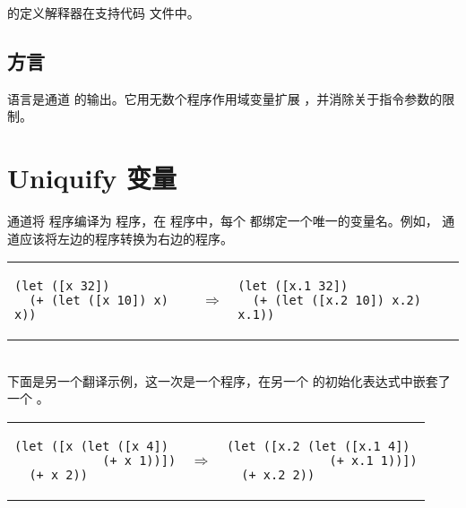 \documentclass[11pt]{book}
\begin{document}
 \LangCVar{} 的定义解释器在支持代码  文件中。

\subsection{\LangXVar{} 方言}

\LangXVar{} 语言是通道
 的输出。它用无数个程序作用域变量扩展 \LangXInt{} ，并消除关于指令参数的限制。


\section{Uniquify 变量}
\label{sec:uniquify-Rvar}

 通道将 \LangVar{} 程序编译为 \LangVar{}
程序，在 \LangVar{} 程序中，每个  都绑定一个唯一的变量名。例如，  通道应该将左边的程序转换为右边的程序。 \\
\begin{tabular}{lll}
\begin{minipage}{0.4\textwidth}
\begin{lstlisting}
(let ([x 32])
  (+ (let ([x 10]) x) x))
\end{lstlisting}
\end{minipage}
&
$\Rightarrow$
&
\begin{minipage}{0.4\textwidth}
\begin{lstlisting}
(let ([x.1 32])
  (+ (let ([x.2 10]) x.2) x.1))
\end{lstlisting}
\end{minipage}
\end{tabular} \\
%
下面是另一个翻译示例，这一次是一个程序，在另一个  的初始化表达式中嵌套了一个
 。\\
\begin{tabular}{lll}
\begin{minipage}{0.4\textwidth}
\begin{lstlisting}
(let ([x (let ([x 4])
            (+ x 1))])
  (+ x 2))
\end{lstlisting}
\end{minipage}
&
$\Rightarrow$
&
\begin{minipage}{0.4\textwidth}
\begin{lstlisting}
(let ([x.2 (let ([x.1 4])
              (+ x.1 1))])
  (+ x.2 2))
\end{lstlisting}
\end{minipage}
\end{tabular}
\end{document}
